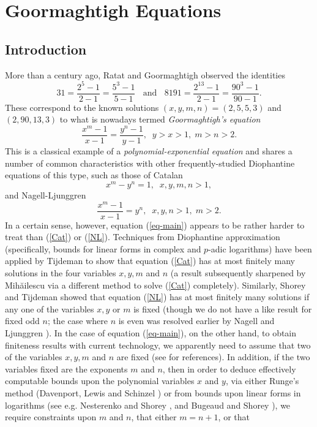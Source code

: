 
\chapter{Goormaghtigh Equations}
\label{ch:Goormaghtigh} 



\section{Introduction} \label{intro}
More than a century ago, Ratat \cite{Ra} and Goormaghtigh \cite{Go} observed the identities
$$
31 = \frac{2^5-1}{2-1} = \frac{5^3-1}{5-1} \; \; \mbox{ and } \; \; 8191 = \frac{2^{13}-1}{2-1} = \frac{90^3-1}{90-1}.
$$
These correspond to the known solutions $(x,y,m,n)=(2,5,5,3)$ and $(2,90,13,3)$
to what is nowadays termed {\it Goormaghtigh's equation}
\begin{equation} \label{eq-main}
\frac{x^m-1}{x-1} = \frac{y^n-1}{y-1}, \; \; y>x>1, \; m > n > 2.
\end{equation}
This is a classical example of a {\it polynomial-exponential equation} and shares a number of common characteristics with other frequently-studied Diophantine equations of this type, such as those of 
Catalan
\begin{equation} \label{Cat}
x^m-y^n=1, \; \; x, y, m, n > 1,
\end{equation}
and 
Nagell-Ljunggren 
\begin{equation} \label{NL}
\frac{x^m-1}{x-1} = y^n, \; \; x, y, n >1, \; m > 2.
\end{equation}
In a certain sense, however, equation (\ref{eq-main}) appears to be rather harder to treat than (\ref{Cat}) or (\ref{NL}). Techniques from Diophantine approximation (specifically, bounds for linear forms in complex and $p$-adic logarithms) have been applied by Tijdeman \cite{Ti} to show that equation (\ref{Cat}) has at most finitely many solutions in the four variables $x,y, m$ and $n$ (a result subsequently sharpened by Mih{\u{a}}ilescu \cite{Mih} via a different method to solve (\ref{Cat}) completely). Similarly, Shorey and Tijdeman \cite{ShTi} showed that equation (\ref{NL}) has at most finitely many solutions if any one of the variables $x, y$ or $m$ is fixed (though we do not have a like result for fixed odd $n$; the case where $n$ is even was resolved earlier by Nagell \cite{Nag} and Ljunggren \cite{Lju}). In the case of equation (\ref{eq-main}), on the other hand, to obtain finiteness results with current technology, we apparently need to assume that two of the variables $x, y, m$ and $n$ are fixed (see \cite{BaSh} for references). In addition, if the two variables fixed are the exponents $m$ and $n$, then in order to deduce effectively computable bounds upon the polynomial variables $x$ and $y$, via either Runge's method (Davenport, Lewis and Schinzel \cite{DaLeSc}) or from bounds upon linear forms in logarithms (see e.g. Nesterenko and Shorey \cite{NeSh}, and Bugeaud and Shorey \cite{BuSh}), we require constraints upon $m$ and $n$, that either $m=n+1$, or that
